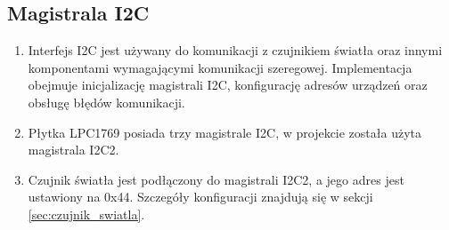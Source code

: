 \subsection{Magistrala I2C}
\begin{enumerate}
    \item Interfejs I2C jest używany do komunikacji z czujnikiem światła oraz innymi komponentami wymagającymi komunikacji szeregowej. Implementacja obejmuje inicjalizację magistrali I2C, konfigurację adresów urządzeń oraz obsługę błędów komunikacji.
    \item Płytka LPC1769 posiada trzy magistrale I2C, w projekcie została użyta magistrala I2C2. 
    \item Czujnik światła jest podłączony do magistrali I2C2, a jego adres jest ustawiony na 0x44. Szczegóły konfiguracji znajdują się w sekcji \ref{sec:czujnik_swiatla}.
\end{enumerate}

